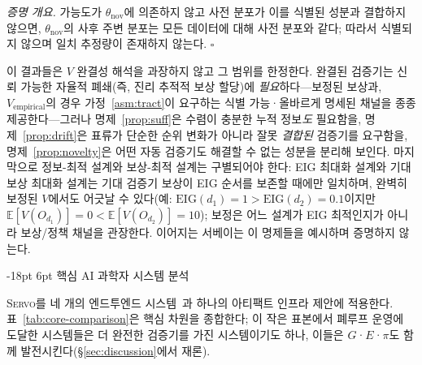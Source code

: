 \documentclass[11pt]{article}
\makeatletter
\renewcommand\section{\@startsection{section}{1}{\z@}%
  {-18pt \@plus -4pt \@minus -2pt}%
  {6pt \@plus 2pt}%
  {\normalfont\large\bfseries}}
\newcommand{\framework}{\textsc{Servo}}
\makeatother
\begin{document}
\noindent\emph{증명 개요.} 가능도가 $\theta_{\mathrm{nov}}$에 의존하지 않고 사전 분포가 이를 식별된 성분과 결합하지 않으면, $\theta_{\mathrm{nov}}$의 사후 주변 분포는 모든 데이터에 대해 사전 분포와 같다; 따라서 식별되지 않으며 일치 추정량이 존재하지 않는다. $\square$

이 결과들은 $V$ 완결성 해석을 과장하지 않고 그 범위를 한정한다. 완결된 검증기는 신뢰 가능한 자율적 폐쇄(즉, 진리 추적적 보상 할당)에 \emph{필요}하다---보정된 보상과, $V_\text{empirical}$의 경우 가정~\ref{asm:tract}이 요구하는 식별 가능·올바르게 명세된 채널을 종종 제공한다---그러나 명제~\ref{prop:suff}은 수렴이 충분한 누적 정보\emph{도} 필요함을, 명제~\ref{prop:drift}은 표류가 단순한 순위 변화가 아니라 잘못 \emph{결합된} 검증기를 요구함을, 명제~\ref{prop:novelty}은 어떤 자동 검증기도 해결할 수 없는 성분을 분리해 보인다. 마지막으로 정보-최적 설계와 보상-최적 설계는 구별되어야 한다: EIG 최대화 설계와 기대 보상 최대화 설계는 기대 검증기 보상이 EIG 순서를 보존할 때에만 일치하며, 완벽히 보정된 $V$에서도 어긋날 수 있다(예: $\mathrm{EIG}(d_1)=1>\mathrm{EIG}(d_2)=0.1$이지만 $\mathbb{E}[V(O_{d_1})]=0<\mathbb{E}[V(O_{d_2})]=10$); 보정은 어느 설계가 EIG 최적인지가 아니라 보상/정책 채널을 관장한다. 이어지는 서베이는 이 명제들을 예시하며 증명하지 않는다.

\section{핵심 AI 과학자 시스템 분석}
\label{sec:core}

\framework{}를 네 개의 엔드투엔드 시스템~\citep{boiko2023emergent,lu2024aiscientist,lu2026aiscientist,schmidgall2025agentlab}과 하나의 아티팩트 인프라 제안에 적용한다. 표~\ref{tab:core-comparison}은 핵심 차원을 종합한다; 이 작은 표본에서 폐루프 운영에 도달한 시스템들은 더 완전한 검증기를 가진 시스템이기도 하나, 이들은 $G$·$E$·$\pi$도 함께 발전시킨다(§\ref{sec:discussion}에서 재론).
\end{document}
